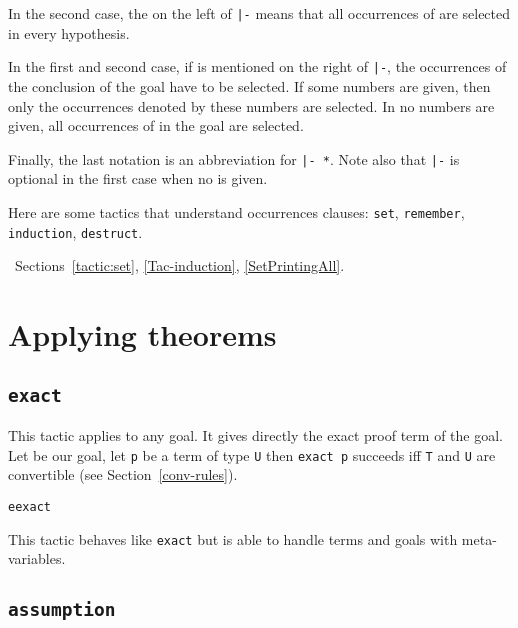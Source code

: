In the second case, the {\tt *} on the left of {\tt |-} means that
all occurrences of {\term} are selected in every hypothesis.

In the first and second case, if {\tt *} is mentioned on the right of
{\tt |-}, the occurrences of the conclusion of the goal have to be
selected. If some numbers are given, then only the occurrences denoted
by these numbers are selected. In no numbers are given, all
occurrences of {\term} in the goal are selected.

Finally, the last notation is an abbreviation for {\tt * |- *}. Note
also that {\tt |-} is optional in the first case when no {\tt *} is
given.

Here are some tactics that understand occurrences clauses:
{\tt set}, {\tt remember}, {\tt induction}, {\tt destruct}.

\SeeAlso~Sections~\ref{tactic:set}, \ref{Tac-induction}, \ref{SetPrintingAll}.

\section{Applying theorems}

\subsection{\tt exact \term}
\label{exact}

This tactic applies to any goal. It gives directly the exact proof
term of the goal. Let {\T} be our goal, let {\tt p} be a term of type
{\tt U} then {\tt exact p} succeeds iff {\tt T} and {\tt U} are
convertible (see Section~\ref{conv-rules}).

\begin{ErrMsgs}
\item {}
\end{ErrMsgs}

\begin{Variants}
  \item \texttt{eexact \term}

    This tactic behaves like \texttt{exact} but is able to handle terms
    and goals with meta-variables.

\end{Variants}

\subsection{\tt assumption}

